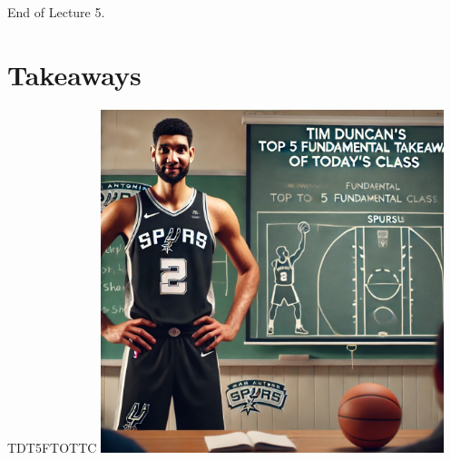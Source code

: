 \documentclass{beamer}
\begin{document}


\begin{frame}{}
    \centering
    \Huge End of Lecture 5.
\end{frame}

\section*{Takeaways}

\begin{frame}{TDT5FTOTTC}
    \centering
    \includegraphics[width=0.75\textwidth]{figures/tim.png}
\end{frame}
\end{document}
